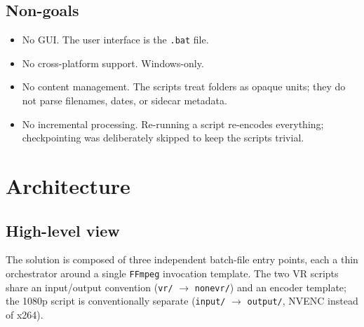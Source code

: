 \documentclass[11pt,a4paper]{article}
\begin{document}
\subsection{Non-goals}
\begin{itemize}[leftmargin=1.5em, itemsep=0.2em]
  \item No GUI. The user interface is the \texttt{.bat} file.
  \item No cross-platform support. Windows-only.
  \item No content management. The scripts treat folders as opaque
        units; they do not parse filenames, dates, or sidecar metadata.
  \item No incremental processing. Re-running a script re-encodes
        everything; checkpointing was deliberately skipped to keep the
        scripts trivial.
\end{itemize}

\section{Architecture}

\subsection{High-level view}

The solution is composed of three independent batch-file entry points,
each a thin orchestrator around a single \texttt{FFmpeg} invocation
template. The two VR scripts share an input/output convention
(\texttt{vr/} $\rightarrow$ \texttt{nonevr/}) and an encoder template;
the 1080p script is conventionally separate (\texttt{input/}
$\rightarrow$ \texttt{output/}, NVENC instead of x264).
\end{document}
